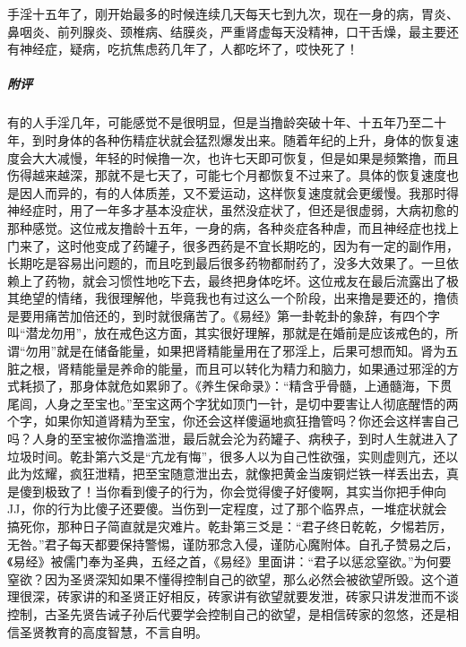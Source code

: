 \begin{case}
    手淫十五年了，刚开始最多的时候连续几天每天七到九次，现在一身的病，胃炎、鼻咽炎、前列腺炎、颈椎病、结膜炎，严重肾虚每天没精神，口干舌燥，最主要还有神经症，疑病，吃抗焦虑药几年了，人都吃坏了，哎快死了！
    \subparagraph{附评} 有的人手淫几年，可能感觉不是很明显，但是当撸龄突破十年、十五年乃至二十年，到时身体的各种伤精症状就会猛烈爆发出来。随着年纪的上升，身体的恢复速度会大大减慢，年轻的时候撸一次，也许七天即可恢复，但是如果是频繁撸，而且伤得越来越深，那就不是七天了，可能七个月都恢复不过来了。具体的恢复速度也是因人而异的，有的人体质差，又不爱运动，这样恢复速度就会更缓慢。我那时得神经症时，用了一年多才基本没症状，虽然没症状了，但还是很虚弱，大病初愈的那种感觉。这位戒友撸龄十五年，一身的病，各种炎症各种虐，而且神经症也找上门来了，这时他变成了药罐子，很多西药是不宜长期吃的，因为有一定的副作用，长期吃是容易出问题的，而且吃到最后很多药物都耐药了，没多大效果了。一旦依赖上了药物，就会习惯性地吃下去，最终把身体吃坏。这位戒友在最后流露出了极其绝望的情绪，我很理解他，毕竟我也有过这么一个阶段，出来撸是要还的，撸债是要用痛苦加倍还的，到时就很痛苦了。《易经》第一卦乾卦的象辞，有四个字叫“潜龙勿用”，放在戒色这方面，其实很好理解，那就是在婚前是应该戒色的，所谓“勿用”就是在储备能量，如果把肾精能量用在了邪淫上，后果可想而知。肾为五脏之根，肾精能量是养命的能量，而且可以转化为精力和脑力，如果通过邪淫的方式耗损了，那身体就危如累卵了。《养生保命录》：“精含乎骨髓，上通髓海，下贯尾闾，人身之至宝也。”至宝这两个字犹如顶门一针，是切中要害让人彻底醒悟的两个字，如果你知道肾精为至宝，你还会这样傻逼地疯狂撸管吗？你还会这样害自己吗？人身的至宝被你滥撸滥泄，最后就会沦为药罐子、病秧子，到时人生就进入了垃圾时间。乾卦第六爻是“亢龙有悔”，很多人以为自己性欲强，实则虚则亢，还以此为炫耀，疯狂泄精，把至宝随意泄出去，就像把黄金当废铜烂铁一样丢出去，真是傻到极致了！当你看到傻子的行为，你会觉得傻子好傻啊，其实当你把手伸向JJ，你的行为比傻子还要傻。当伤到一定程度，过了那个临界点，一堆症状就会搞死你，那种日子简直就是灾难片。乾卦第三爻是：“君子终日乾乾，夕惕若厉，无咎。”君子每天都要保持警惕，谨防邪念入侵，谨防心魔附体。自孔子赞易之后，《易经》被儒门奉为圣典，五经之首，《易经》里面讲：“君子以惩忿窒欲。”为何要窒欲？因为圣贤深知如果不懂得控制自己的欲望，那么必然会被欲望所毁。这个道理很深，砖家讲的和圣贤正好相反，砖家讲有欲望就要发泄，砖家只讲发泄而不谈控制，古圣先贤告诫子孙后代要学会控制自己的欲望，是相信砖家的忽悠，还是相信圣贤教育的高度智慧，不言自明。
\end{case}

